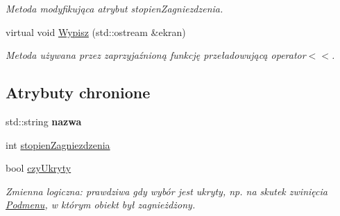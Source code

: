 \begin{DoxyCompactItemize}
\begin{DoxyCompactList}\small\item\em Metoda modyfikująca atrybut stopien\-Zagniezdzenia. \end{DoxyCompactList}\item 
\hypertarget{classWybor_a42cb8cae1bafe052a3b96eddee87de62}{virtual void \hyperlink{classWybor_a42cb8cae1bafe052a3b96eddee87de62}{Wypisz} (std\-::ostream \&ekran)}\label{classWybor_a42cb8cae1bafe052a3b96eddee87de62}

\begin{DoxyCompactList}\small\item\em Metoda używana przez zaprzyjaźnioną funkcję przeładowującą operator$<$$<$. \end{DoxyCompactList}\end{DoxyCompactItemize}
\subsection*{Atrybuty chronione}
\begin{DoxyCompactItemize}
\item 
\hypertarget{classWybor_ada1632e8ce78ba40ea8f491f2db66b77}{std\-::string {\bfseries nazwa}}\label{classWybor_ada1632e8ce78ba40ea8f491f2db66b77}

\item 
int \hyperlink{classWybor_aee3503d5cc003f8dd73547fe4e58cef9}{stopien\-Zagniezdzenia}
\item 
\hypertarget{classWybor_a946727299ecc881dc13ac30e1d9f33d8}{bool \hyperlink{classWybor_a946727299ecc881dc13ac30e1d9f33d8}{czy\-Ukryty}}\label{classWybor_a946727299ecc881dc13ac30e1d9f33d8}

\begin{DoxyCompactList}\small\item\em Zmienna logiczna\-: prawdziwa gdy wybór jest ukryty, np. na skutek zwinięcia \hyperlink{classPodmenu}{Podmenu}, w którym obiekt był zagnieżdżony. \end{DoxyCompactList}\end{DoxyCompactItemize}
